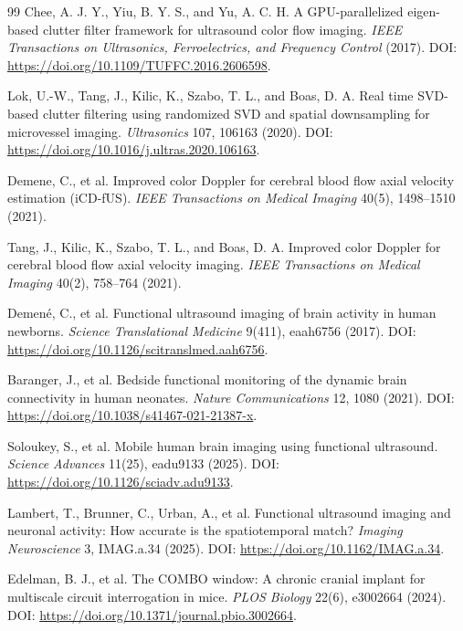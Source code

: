 \documentclass[11pt]{article}
\begin{document}
\begin{thebibliography}{99}
Chee, A. J. Y., Yiu, B. Y. S., and Yu, A. C. H.
\newblock A GPU-parallelized eigen-based clutter filter framework for ultrasound color flow imaging.
\newblock \emph{IEEE Transactions on Ultrasonics, Ferroelectrics, and Frequency Control} (2017).
\newblock DOI: \url{https://doi.org/10.1109/TUFFC.2016.2606598}.

Lok, U.-W., Tang, J., Kilic, K., Szabo, T. L., and Boas, D. A.
\newblock Real time SVD-based clutter filtering using randomized SVD and spatial downsampling for microvessel imaging.
\newblock \emph{Ultrasonics} 107, 106163 (2020).
\newblock DOI: \url{https://doi.org/10.1016/j.ultras.2020.106163}.

Demene, C., et al.
\newblock Improved color Doppler for cerebral blood flow axial velocity estimation (iCD-fUS).
\newblock \emph{IEEE Transactions on Medical Imaging} 40(5), 1498--1510 (2021).

Tang, J., Kilic, K., Szabo, T. L., and Boas, D. A.
\newblock Improved color Doppler for cerebral blood flow axial velocity imaging.
\newblock \emph{IEEE Transactions on Medical Imaging} 40(2), 758--764 (2021).

Demen{\'e}, C., et al.
\newblock Functional ultrasound imaging of brain activity in human newborns.
\newblock \emph{Science Translational Medicine} 9(411), eaah6756 (2017).
\newblock DOI: \url{https://doi.org/10.1126/scitranslmed.aah6756}.

Baranger, J., et al.
\newblock Bedside functional monitoring of the dynamic brain connectivity in human neonates.
\newblock \emph{Nature Communications} 12, 1080 (2021).
\newblock DOI: \url{https://doi.org/10.1038/s41467-021-21387-x}.

Soloukey, S., et al.
\newblock Mobile human brain imaging using functional ultrasound.
\newblock \emph{Science Advances} 11(25), eadu9133 (2025).
\newblock DOI: \url{https://doi.org/10.1126/sciadv.adu9133}.

Lambert, T., Brunner, C., Urban, A., et al.
\newblock Functional ultrasound imaging and neuronal activity: How accurate is the spatiotemporal match?
\newblock \emph{Imaging Neuroscience} 3, IMAG.a.34 (2025).
\newblock DOI: \url{https://doi.org/10.1162/IMAG.a.34}.

Edelman, B. J., et al.
\newblock The COMBO window: A chronic cranial implant for multiscale circuit interrogation in mice.
\newblock \emph{PLOS Biology} 22(6), e3002664 (2024).
\newblock DOI: \url{https://doi.org/10.1371/journal.pbio.3002664}.


\end{thebibliography}
\end{document}
